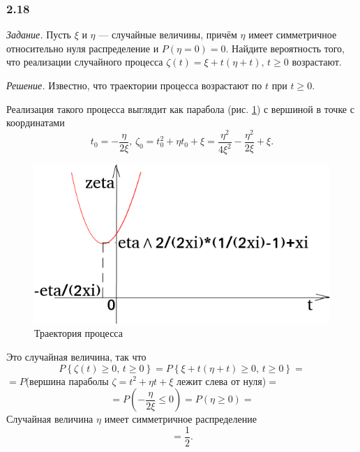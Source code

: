 \subsubsection*{2.18}

\textit{Задание.}
Пусть $ \xi $ и $ \eta $ --- случайные величины,
причём $ \eta $ имеет симметричное относительно нуля распределение и
$P \left( \eta = 0 \right) =
  0$.
Найдите вероятность того, что реализации случайного процесса
$ \zeta \left( t \right) = \xi + t \left( \eta + t \right), \, t \geq 0$ возрастают.

\textit{Решение.}
Известно, что траектории процесса возрастают по $t$ при $t \geq 0$.

Реализация такого процесса выглядит как парабола (рис. \ref{fig:218}) с вершиной в точке с координатами
$$t_0 = -\frac{ \eta }{2 \xi }, \,
  \zeta_0 = t_0^2 + \eta t_0 + \xi = \frac{ \eta^2}{4 \xi^2} - \frac{ \eta^2}{2 \xi }  + \xi.$$

\begin{figure}[h!]
 \centering
 \includegraphics[width=.5\textwidth]{./pictures/2_18.png}
 \caption{Траектория процесса}
 \label{fig:218}
\end{figure}

Это случайная величина, так что
$$P \left\{ \zeta \left( t \right) \geq 0, \, t \geq 0 \right\} =
  P \left\{ \xi + t \left( \eta + t \right) \geq 0, \, t \geq 0 \right\} =$$
$=P$(вершина параболы $ \zeta = t^2 + \eta t + \xi $ лежит слева от нуля)$=$
$$= P \left( -\frac{ \eta }{2 \xi } \leq 0 \right) =
  P \left( \eta \geq 0 \right) =$$
Случайная величина $ \eta $ имеет симметричное распределение
$$= \frac{1}{2}.$$
